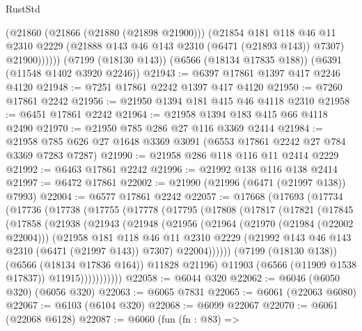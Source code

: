 \begin{lexlean}{RustStd}
\begin{coremodule}
            (@21860
              (@21866 (@21880 (@21898 @21900)))
              (@21854
                @181
                @118
                @46
                @11
                @2310
                @2229
                (@21888 @143 @46 @143 @2310 (@6471 (@21893 @143)) @7307)
                @21900))))))
    (@7199 (@18130 @143))
    (@6566 (@18134 @17835 @188))
    (@6391 (@11548 @1402 @3920 @2246))
@21943 := @6397 @17861 @1397 @417 @2246 @4120
@21948 := @7251 @17861 @2242 @1397 @417 @4120
@21950 := @7260 @17861 @2242
@21956 := @21950 @1394 @181 @415 @46 @4118 @2310
@21958 := @6451 @17861 @2242
@21964 := @21958 @1394 @183 @415 @66 @4118 @2490
@21970 := @21950 @785 @286 @27 @116 @3369 @2414
@21984 := @21958 @785 @626 @27 @1648 @3369 @3091 (@6553 @17861 @2242 @27 @784 @3369 @7283 @7287)
@21990 := @21958 @286 @118 @116 @11 @2414 @2229
@21992 := @6463 @17861 @2242
@21996 := @21992 @138 @116 @138 @2414
@21997 := @6472 @17861
@22002 := @21990 (@21996 (@6471 (@21997 @138)) @7993)
@22004 := @6577 @17861 @2242
@22057 := @17668
    (@17693
      (@17734
        (@17736
          (@17738
            (@17755
              (@17778
                (@17795
                  (@17808
                    (@17817
                      (@17821
                        (@17845
                          (@17858
                            (@21938
                              (@21943
                                (@21948
                                  (@21956
                                    (@21964
                                      (@21970 (@21984 (@22002 @22004)))
                                      (@21958
                                        @181
                                        @118
                                        @46
                                        @11
                                        @2310
                                        @2229
                                        (@21992 @143 @46 @143 @2310 (@6471 (@21997 @143)) @7307)
                                        @22004))))))
                            (@7199 (@18130 @138))
                            (@6566 (@18134 @17836 @164))
                            @11828
                            @21196)
                          @11903
                          (@6566 (@11909 @1538 @17837))
                          @11915)))))))))))
@22058 := @6044 @320
@22062 := @6046 (@6050 @320) (@6056 @320)
@22063 := @6065 @7831
@22065 := @6061 (@22063 @6080)
@22067 := @6103 (@6104 @320)
@22068 := @6099 @22067
@22070 := @6061 (@22068 @6128)
@22087 := @6060
    (fun (fn : @83) =>

\end{coremodule}
\end{lexlean}
